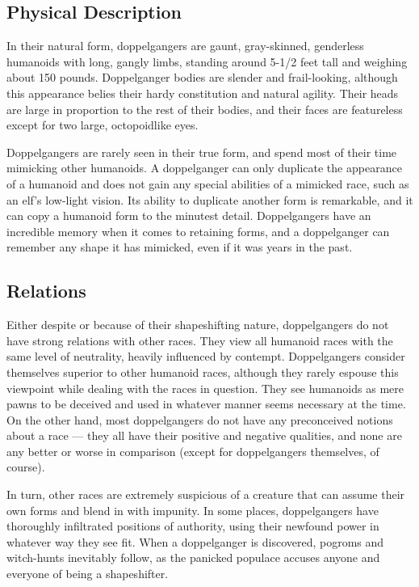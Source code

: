 \subsection{Physical Description}
{In their natural form, doppelgangers are gaunt, gray-skinned, genderless humanoids with long, gangly limbs, standing around 5-1/2 feet tall and weighing about 150 pounds. Doppelganger bodies are slender and frail-looking, although this appearance belies their hardy constitution and natural agility. Their heads are large in proportion to the rest of their bodies, and their faces are featureless except for two large, octopoidlike eyes.

Doppelgangers are rarely seen in their true form, and spend most of their time mimicking other humanoids. A doppelganger can only duplicate the appearance of a humanoid and does not gain any special abilities of a mimicked race, such as an elf’s low-light vision. Its ability to duplicate another form is remarkable, and it can copy a humanoid form to the minutest detail. Doppelgangers have an incredible memory when it comes to retaining forms, and a doppelganger can remember any shape it has mimicked, even if it was years in the past.}

\subsection{Relations}
{Either despite or because of their shapeshifting nature, doppelgangers do not have strong relations with other races. They view all humanoid races with the same level of neutrality, heavily influenced by contempt. Doppelgangers consider themselves superior to other humanoid races, although they rarely espouse this viewpoint while dealing with the races in question. They see humanoids as mere pawns to be deceived and used in whatever manner seems necessary at the time. On the other hand, most doppelgangers do not have any preconceived notions about a race — they all have their positive and negative qualities, and none are any better or worse in comparison (except for doppelgangers themselves, of course).

In turn, other races are extremely suspicious of a creature that can assume their own forms and blend in with impunity. In some places, doppelgangers have thoroughly infiltrated positions of authority, using their newfound power in whatever way they see fit. When a doppelganger is discovered, pogroms and witch-hunts inevitably follow, as the panicked populace accuses anyone and everyone of being a shapeshifter.}


